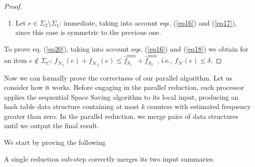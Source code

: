 \documentclass[final,3p,times]{elsarticle}
\begin{document}
\begin{proof}
\begin{enumerate}
  \item Let $e \in \Sigma_2 \setminus \Sigma_1$: immediate, taking into account eqs. (\ref{eq16}) and (\ref{eq17}), since this case is symmetric to the previous one.
\end{enumerate}

To prove eq. (\ref{eq20}), taking into account eqs. (\ref{eq16}) and (\ref{eq18}) we obtain for an item $e \notin \Sigma_C$: $f_{\mathcal{N}_1}(e) + f_{\mathcal{N}_2}(e) \leq \hat{f}_{\mathcal{S}_1}^{min} + \hat{f}_{\mathcal{S}_2}^{min}$, i.e., $f_{\mathcal{N}}(e) \leq \delta$.

\end{proof}



Now we can formally prove the correctness of our parallel algorithm. Let us consider how it works. Before engaging in the parallel reduction, each processor applies the sequential Space Saving algorithm to its local input, producing an hash table data structure containing at most $k$ counters with estimated frequency greater than zero. In the parallel reduction, we merge pairs of data structures until we output the final result. 

We start by proving the following

\begin{thm}
\label{pr-single-step}
A single reduction sub-step correctly merges its two input summaries.
\end{thm}
\end{document}
